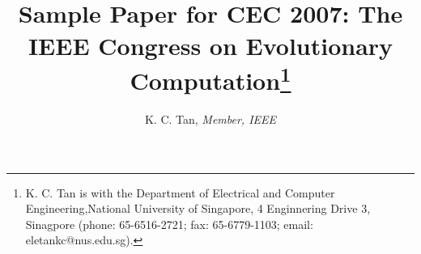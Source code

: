 \title{\ \\ \LARGE\bf Sample Paper for CEC 2007: The IEEE 
 Congress on Evolutionary Computation\thanks{K. C. Tan is with the
Department of Electrical and Computer Engineering,National University of Singapore, 4 Enginnering Drive 3, Sinagpore
(phone: 65-6516-2721; fax: 65-6779-1103; email: eletankc@nus.edu.sg).}
}

\author{K. C. Tan, {\it Member, IEEE}}

\maketitle
